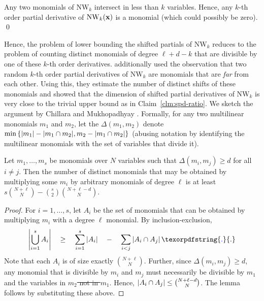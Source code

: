 \documentclass{birkjour}
\newcommand{\spaced}[1]{\quad#1\quad}
\providecommand{\DIFaddtex}[1]{{\protect\color{blue}\uwave{#1}}} %
\providecommand{\DIFdeltex}[1]{{\protect\color{red}\sout{#1}}}                      %
\providecommand{\DIFaddbegin}{} %
\providecommand{\DIFaddend}{} %
\providecommand{\DIFdelbegin}{} %
\providecommand{\DIFdelend}{} %
\providecommand{\DIFadd}[1]{\texorpdfstring{\DIFaddtex{#1}}{#1}} %
\providecommand{\DIFdel}[1]{\texorpdfstring{\DIFdeltex{#1}}{}} %
\begin{document}
\begin{observation}
Any two monomials of $\mathrm{NW}_k$ intersect in less than $k$ variables. Hence, any $k$-th order partial derivative of $\mathrm{NW}_k(\mathbf{x})$ is a monomial (which could possibly be zero). \qed
\end{observation}

Hence, the problem of lower bounding the shifted partials of $\mathrm{NW}_k$ reduces to the problem of counting distinct monomials of degree $\ell + d-k$ that are divisible by one of these $k$-th order derivatives. \cite{KSS13} additionally used the observation that two random $k$-th order partial derivatives of $\mathrm{NW}_k$ are monomials that are \emph{far} from each other. Using this, they estimate the number of distinct shifts of these monomials and showed that the dimension of shifted partial derivatives of $\mathrm{NW}_k$ is very close to the trivial upper bound as in Claim~\ref{clm:spd-ratio}. We sketch the argument by Chillara and Mukhopadhyay \cite{cm14}. Formally, for any two multilinear monomials $m_1$ and $m_2$, let the $\Delta(m_1,m_2)$ denote $\min\left\{|m_1| - |m_1\cap m_2|, m_2 - |m_1 \cap m_2|\right\}$ (abusing notation by identifying the multilinear monomials with the set of variables that divide it). 

\begin{lemma}[\cite{cm14}]\label{lem:cm-inc-exc}
Let $m_1,\dots, m_s$ be monomials over $N$ variables such that $\Delta(m_i, m_j) \geq d$ for all $i\neq j$. Then the number of distinct monomials that may be obtained by multiplying some $m_i$ by arbitrary monomials of degree $\ell$ is at least $s \binom{N+\ell}{N} - \binom{s}{2} \binom{N+\ell - d}{N}$. 
\end{lemma}
\begin{proof}
For $i = 1,\dots, s$, let $A_i$ be the set of monomials that can be obtained by multiplying $m_i$ with a degree $\ell$ monomial. By inclusion-exclusion, 
$$
\abs{\Union_{i=1}^s A_i} \spaced{\geq} \sum_{i=1}^s \abs{A_i} \spaced{-} \sum_{i<j} \abs{A_i \intersection A_j}\DIFaddbegin \DIFadd{.
}\DIFaddend $$
Note that each $A_i$ is of size exactly $\binom{N+\ell}{N}$. Further, since $\Delta(m_i, m_j) \geq d$, any monomial that is divisible by $m_i$ and $m_j$ must necessarily be divisible by \DIFdelbegin \DIFdel{$m_1$ }\DIFdelend \DIFaddbegin \DIFadd{$m_i$ }\DIFaddend and the variables in \DIFdelbegin \DIFdel{$m_2$ not in $m_1$}\DIFdelend \DIFaddbegin \DIFadd{$m_j$ not in $m_i$}\DIFaddend . Hence, $\left|A_i\cap A_j\right| \leq \binom{N + \ell - d}{N}$. The lemma follows by substituting these above. 
\end{proof}
\end{document}
